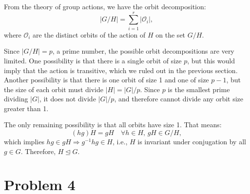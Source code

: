 \documentclass[12pt]{article}
\begin{document}
\begin{enumerate}[label=(\arabic*)]
From the theory of group actions, we have the orbit decomposition:
\[
|G/H| = \sum_{i=1}^r |\mathcal{O}_i|,
\]
where \( \mathcal{O}_i \) are the distinct orbits of the action of \( H \) on the set \( G/H \).

Since \( |G/H| = p \), a prime number, the possible orbit decompositions are very limited. One possibility is that there is a single orbit of size \( p \), but this would imply that the action is transitive, which we ruled out in the previous section. Another possibility is that there is one orbit of size 1 and one of size \( p - 1 \), but the size of each orbit must divide \( |H| = |G|/p \). Since \( p \) is the smallest prime dividing \( |G| \), it does not divide \( |G|/p \), and therefore cannot divide any orbit size greater than 1.

The only remaining possibility is that all orbits have size 1. That means:
\[
(hg)H = gH \quad \forall h \in H,\, gH \in G/H,
\]
which implies \( hg \in gH \Rightarrow g^{-1}hg \in H \), i.e., \( H \) is invariant under conjugation by all \( g \in G \). Therefore, \( H \trianglelefteq G \).
\end{enumerate}

\section*{Problem 4}
\end{document}
